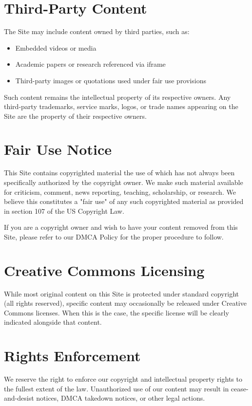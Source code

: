 \documentclass[11pt]{article}
\begin{document}
\section{Third-Party Content}
The Site may include content owned by third parties, such as:
\begin{itemize}
  \item Embedded videos or media
  \item Academic papers or research referenced via iframe
  \item Third-party images or quotations used under fair use provisions
\end{itemize}

Such content remains the intellectual property of its respective owners. Any third-party trademarks, service marks, logos, or trade names appearing on the Site are the property of their respective owners.

\section{Fair Use Notice}
This Site contains copyrighted material the use of which has not always been specifically authorized by the copyright owner. We make such material available for criticism, comment, news reporting, teaching, scholarship, or research. We believe this constitutes a "fair use" of any such copyrighted material as provided in section 107 of the US Copyright Law.

If you are a copyright owner and wish to have your content removed from this Site, please refer to our DMCA Policy for the proper procedure to follow.

\section{Creative Commons Licensing}
While most original content on this Site is protected under standard copyright (all rights reserved), specific content may occasionally be released under Creative Commons licenses. When this is the case, the specific license will be clearly indicated alongside that content.

\section{Rights Enforcement}
We reserve the right to enforce our copyright and intellectual property rights to the fullest extent of the law. Unauthorized use of our content may result in cease-and-desist notices, DMCA takedown notices, or other legal actions.
\end{document}
